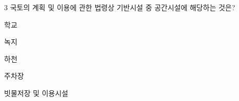 \begin{question}{3}
국토의 계획 및 이용에 관한 법령상 기반시설 중 공간시설에 해당하는 것은?
\begin{choices}
  \item 학교
  \item 녹지
  \item 하천
  \item 주차장
  \item 빗물저장 및 이용시설
\end{choices}
\end{question}
